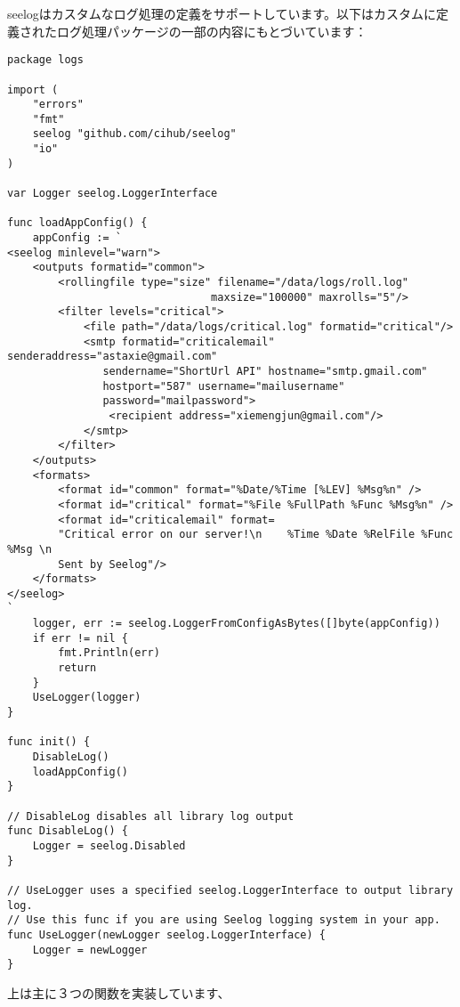 seelogはカスタムなログ処理の定義をサポートしています。以下はカスタムに定義されたログ処理パッケージの一部の内容にもとづいています：

\begin{lstlisting}[numbers=none]
package logs

import (
    "errors"
    "fmt"
    seelog "github.com/cihub/seelog"
    "io"
)

var Logger seelog.LoggerInterface

func loadAppConfig() {
    appConfig := `
<seelog minlevel="warn">
    <outputs formatid="common">
        <rollingfile type="size" filename="/data/logs/roll.log"
                                maxsize="100000" maxrolls="5"/>
        <filter levels="critical">
            <file path="/data/logs/critical.log" formatid="critical"/>
            <smtp formatid="criticalemail" senderaddress="astaxie@gmail.com"
               sendername="ShortUrl API" hostname="smtp.gmail.com"
               hostport="587" username="mailusername"
               password="mailpassword">
                <recipient address="xiemengjun@gmail.com"/>
            </smtp>
        </filter>
    </outputs>
    <formats>
        <format id="common" format="%Date/%Time [%LEV] %Msg%n" />
        <format id="critical" format="%File %FullPath %Func %Msg%n" />
        <format id="criticalemail" format=
        "Critical error on our server!\n    %Time %Date %RelFile %Func %Msg \n
        Sent by Seelog"/>
    </formats>
</seelog>
`
    logger, err := seelog.LoggerFromConfigAsBytes([]byte(appConfig))
    if err != nil {
        fmt.Println(err)
        return
    }
    UseLogger(logger)
}

func init() {
    DisableLog()
    loadAppConfig()
}

// DisableLog disables all library log output
func DisableLog() {
    Logger = seelog.Disabled
}

// UseLogger uses a specified seelog.LoggerInterface to output library log.
// Use this func if you are using Seelog logging system in your app.
func UseLogger(newLogger seelog.LoggerInterface) {
    Logger = newLogger
}
\end{lstlisting}

上は主に３つの関数を実装しています、

